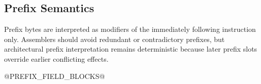\subsection{Prefix Semantics}
Prefix bytes are interpreted as modifiers of the immediately following instruction only. Assemblers should
avoid redundant or contradictory prefixes, but architectural prefix interpretation remains deterministic
because later prefix slots override earlier conflicting effects.

@PREFIX_FIELD_BLOCKS@
